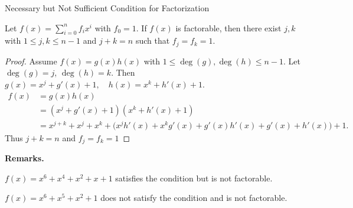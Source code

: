 \documentclass{beamer}
\newcommand{\N}{\mathbb{N}}
\begin{document}


\begin{frame}[shrink=7]{Necessary but Not Sufficient Condition for Factorization}
\small
\begin{theorem}
Let $\displaystyle f(x)=\sum_{i=0}^{n} f_i x^i$ with $f_0=1$.
    If $f(x)$ is factorable, then there exist $j,k$ with $\displaystyle 1 \le j,k\le n-1$ and $j+k=n$ such that $f_j=f_k=1$.
\end{theorem}

\begin{proof}
Assume $f(x)=g(x)h(x)$ with $1\le \deg(g),\deg(h)\le n-1 $. Let $\deg(g)=j$, $\deg(h)=k$. Then  
$\displaystyle g(x)=x^j+g'(x)+1,\quad h(x)=x^k+h'(x)+1$.
\begin{align*}
    f(x) &=g(x)h(x)\\
    &=(x^j+g'(x)+1)(x^k+h'(x)+1)\\
    &= x^{j+k}+x^j+x^k + \big(x^j h'(x)+x^k g'(x)+g'(x)h'(x)+g'(x)+h'(x)\big)+1.
\end{align*}
Thus $j+k=n$ and $f_j=f_k=1$
\end{proof}
\textbf{Remarks.}

$\displaystyle f(x)=x^6+x^4+x^2+x+1$ satisfies the condition but is not factorable.

$\displaystyle f(x)=x^6+x^5+x^2+1$ does not satisfy the condition and  is not factorable.
\end{frame}
\end{document}
